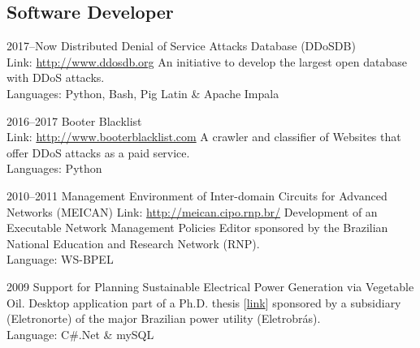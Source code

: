 \documentclass[print]{styles/friggeri-cv-mac} %
\begin{document}


\subsection{Software Developer}\vspace{-5pt}
\begin{entrylist}

\entry
{2017--Now}
{Distributed Denial of Service Attacks Database (DDoSDB)}
{\\Link: \href{http://ddosdb.org}{http://www.ddosdb.org} }
{An initiative to develop the largest open database with DDoS attacks.\\
Languages: Python, Bash, Pig Latin \& Apache Impala
}

\entry
{2016--2017}
{Booter Blacklist}
{\\Link: \href{http://booterblacklist.com}{http://www.booterblacklist.com} }
{A crawler and classifier of Websites that offer DDoS attacks as a paid service.\\
	Languages: Python
}

\entry
{2010--2011}
{{Management Environment of Inter-domain Circuits for Advanced Networks (MEICAN)}}
{Link: \href{http://meican.cipo.rnp.br/}{http://meican.cipo.rnp.br/}}
{Development of an Executable Network Management Policies Editor sponsored by the Brazilian National Education and Research Network (RNP).    \\
Language: WS-BPEL
}

\entry
{2009}
{Support for Planning Sustainable Electrical Power Generation via Vegetable Oil.}
{}
{Desktop application part of a Ph.D. thesis [\href{https://sites.google.com/site/ceamazonufpa/TeseAnaRosaDuarte.pdf}{link}] sponsored by a subsidiary (Eletronorte) of the major Brazilian power utility (Eletrobrás).\\
Language: C\#.Net \& mySQL
}
\end{entrylist}
\end{document}
